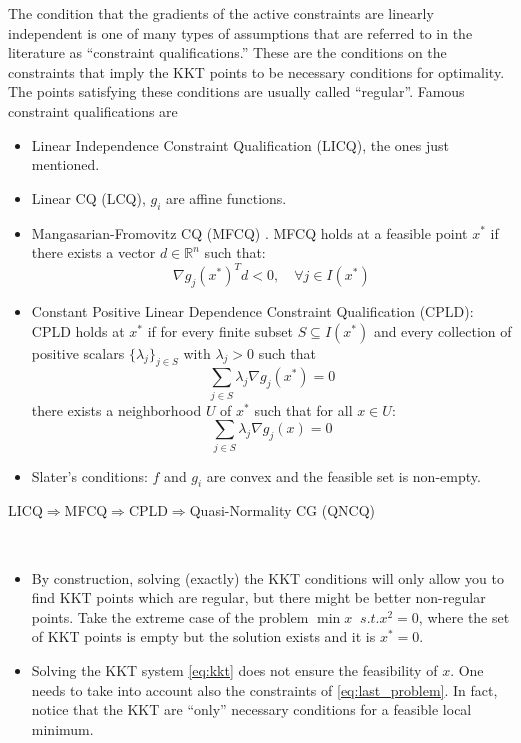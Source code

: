 \documentclass[10pt,a4paper]{article}
\begin{document}
\begin{remark}
	The condition that the gradients of the active constraints are linearly independent
	is one of many types of assumptions that are referred to in the literature as ``constraint
	qualifications.'' These are the conditions on the constraints that imply the KKT points to be necessary conditions for optimality. The points satisfying these conditions are usually called ``regular''. Famous constraint qualifications are 
	\begin{itemize}
		\item Linear Independence Constraint Qualification (LICQ), the ones just mentioned.
		\item Linear CQ (LCQ), $g_i$ are affine functions.
		\item Mangasarian-Fromovitz CQ (MFCQ) \cite{mangasarian67a}. MFCQ holds at a feasible point $x^*$ if there exists a vector $d \in \mathbb{R}^n$ such that:
		$$\nabla g_j(x^*)^T d < 0, \quad \forall j \in I(x^*)$$
		\item Constant Positive Linear Dependence Constraint Qualification (CPLD): CPLD holds at $x^*$ if for every finite subset $S \subseteq I(x^*)$ and every collection of positive scalars $\{\lambda_j\}_{j \in S}$ with $\lambda_j > 0$ such that
		$$\sum_{j \in S} \lambda_j \nabla g_j(x^*) = 0$$
		there exists a neighborhood $U$ of $x^*$ such that for all $x \in U$:
		$$\sum_{j \in S} \lambda_j \nabla g_j(x) = 0$$
		\item Slater's conditions: $f$ and $g_i$ are convex and the feasible set is non-empty.
	\end{itemize}
	LICQ$\Rightarrow$MFCQ$\Rightarrow$CPLD$\Rightarrow$Quasi-Normality CG (QNCQ)
\end{remark}
\begin{remark}
	$ $
	\begin{itemize}
\item By construction, solving (exactly) the KKT conditions will only allow you to find KKT points which are regular, but there might be better non-regular points. Take the extreme case of the problem $\min x\; \; s.t. x^2=0$, where the set of KKT points is empty but the solution exists and it is $x^*=0$.
\item Solving the KKT system \eqref{eq:kkt} does not ensure the feasibility of $x$. One needs to take into account also the constraints of \eqref{eq:last_problem}. In fact, notice that the KKT are ``only'' necessary conditions for a feasible local minimum.
\end{itemize}
\end{remark}
\end{document}
